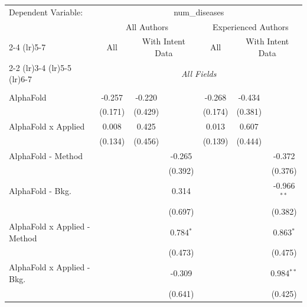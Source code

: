 \begingroup
\centering
\begin{tabular}{lcccccc}
   \tabularnewline \midrule \midrule
   Dependent Variable: & \multicolumn{6}{c}{num\_diseases}\\
 & \multicolumn{3}{c}{All Authors} & \multicolumn{3}{c}{Experienced Authors} \\
\cmidrule(lr){2-4} \cmidrule(lr){5-7}
 & \multicolumn{1}{c}{All} & \multicolumn{2}{c}{With Intent Data} & \multicolumn{1}{c}{All} & \multicolumn{2}{c}{With Intent Data} \\
\cmidrule(lr){2-2} \cmidrule(lr){3-4} \cmidrule(lr){5-5} \cmidrule(lr){6-7}
 & \multicolumn{6}{c}{\textit{All Fields}} \\ \\
   AlphaFold                      & -0.257        & -0.220      &               & -0.268        & -0.434      &   \\   
                                  & (0.171)       & (0.429)     &               & (0.174)       & (0.381)     &   \\   
   AlphaFold x Applied            & 0.008         & 0.425       &               & 0.013         & 0.607       &   \\   
                                  & (0.134)       & (0.456)     &               & (0.139)       & (0.444)     &   \\   
   AlphaFold - Method             &               &             & -0.265        &               &             & -0.372\\   
                                  &               &             & (0.392)       &               &             & (0.376)\\   
   AlphaFold - Bkg.               &               &             & 0.314         &               &             & -0.966$^{**}$\\   
                                  &               &             & (0.697)       &               &             & (0.382)\\   
   AlphaFold x Applied - Method   &               &             & 0.784$^{*}$   &               &             & 0.863$^{*}$\\   
                                  &               &             & (0.473)       &               &             & (0.475)\\   
   AlphaFold x Applied - Bkg.     &               &             & -0.309        &               &             & 0.984$^{**}$\\   
                                  &               &             & (0.641)       &               &             & (0.425)\\   

\end{tabular}
